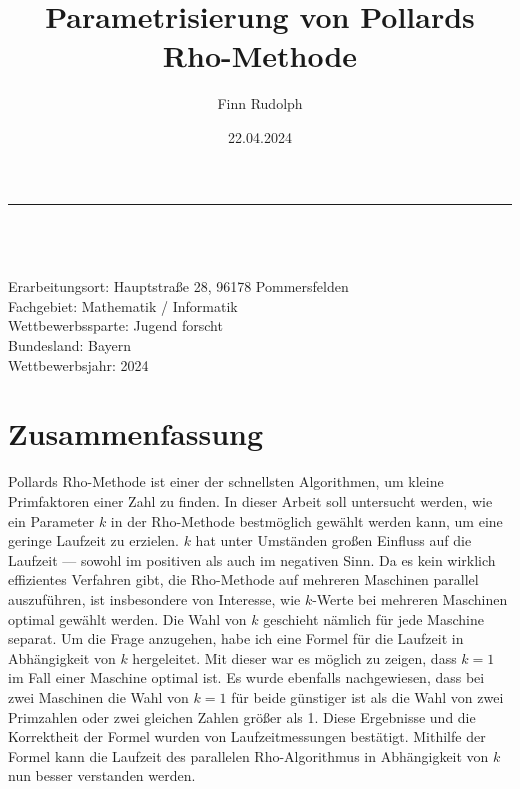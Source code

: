 \documentclass[a4paper, 11pt, ngerman]{article}
\title{Parametrisierung von Pollards Rho-Methode}
\author{Finn Rudolph}
\date{22.04.2024}
\theoremstyle{definition}
\theoremstyle{plain}
\theoremstyle{remark}
\begin{document}
\titleformat{\subsection}[runin]{\bfseries}{\thesubsection}{0.5em}{}

\setcounter{tocdepth}{1}

\begin{titlepage}

    \noindent\rule{\textwidth}{0.4pt}

    \makeatletter
    \begin{flushleft}
        \textbf{\LARGE{\@title}} \\
        \vspace{1.5em}
        \@author \\
        \@date \\
        \vspace{1em}
        Erarbeitungsort: Hauptstraße 28, 96178 Pommersfelden \\
        Fachgebiet: Mathematik / Informatik \\
        Wettbewerbssparte: Jugend forscht \\
        Bundesland: Bayern \\
        Wettbewerbsjahr: 2024
    \end{flushleft}

    \vspace{0.2em}

    \section*{Zusammenfassung}

    Pollards Rho-Methode ist einer der schnellsten Algorithmen, um kleine Primfaktoren einer Zahl zu finden. In dieser Arbeit soll untersucht werden, wie ein Parameter $k$ in der Rho-Methode bestmöglich gewählt werden kann, um eine geringe Laufzeit zu erzielen. $k$ hat unter Umständen großen Einfluss auf die Laufzeit --- sowohl im positiven als auch im negativen Sinn. Da es kein wirklich effizientes Verfahren gibt, die Rho-Methode auf mehreren Maschinen parallel auszuführen, ist insbesondere von Interesse, wie $k$-Werte bei mehreren Maschinen optimal gewählt werden. Die Wahl von $k$ geschieht nämlich für jede Maschine separat. Um die Frage anzugehen, habe ich eine Formel für die Laufzeit in Abhängigkeit von $k$ hergeleitet. Mit dieser war es möglich zu zeigen, dass $k = 1$ im Fall einer Maschine optimal ist. Es wurde ebenfalls nachgewiesen, dass bei zwei Maschinen die Wahl von $k = 1$ für beide günstiger ist als die Wahl von zwei Primzahlen oder zwei gleichen Zahlen größer als 1. Diese Ergebnisse und die Korrektheit der Formel wurden von Laufzeitmessungen bestätigt. Mithilfe der Formel kann die Laufzeit des parallelen Rho-Algorithmus in Abhängigkeit von $k$ nun besser verstanden werden.

    \vspace{0.5em}

    \tableofcontents

    \thispagestyle{empty}
\end{titlepage}
\end{document}
